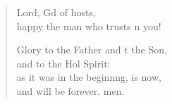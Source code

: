 \begin{verse}
\begin{patverse}
Lord, Gd of hosts,\Med\\
happy the man who trusts \pointup{\i}n you!

Glory to the Father and t the Son,\Med\\
and to the Hol Spirit:\\
as it was in the beginn\pointup{\i}ng, is now,\Med\\
and will be forever. men. 
  \end{patverse}
\end{verse}
